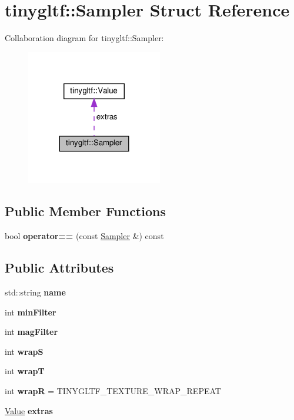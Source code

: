 \hypertarget{structtinygltf_1_1Sampler}{}\section{tinygltf\+:\+:Sampler Struct Reference}
\label{structtinygltf_1_1Sampler}


Collaboration diagram for tinygltf\+:\+:Sampler\+:\nopagebreak
\begin{figure}[H]
\begin{center}
\leavevmode
\includegraphics[width=168pt]{structtinygltf_1_1Sampler__coll__graph}
\end{center}
\end{figure}
\subsection*{Public Member Functions}
\begin{DoxyCompactItemize}
\item 
\mbox{\label{structtinygltf_1_1Sampler_ad94b183fc9b8d862a6063de036fddc02}} 
bool {\bfseries operator==} (const \hyperlink{structtinygltf_1_1Sampler}{Sampler} \&) const
\end{DoxyCompactItemize}
\subsection*{Public Attributes}
\begin{DoxyCompactItemize}
\item 
\mbox{\label{structtinygltf_1_1Sampler_aed306be57c20668b6acd84af81b58dd4}} 
std\+::string {\bfseries name}
\item 
int {\bfseries min\+Filter}
\item 
int {\bfseries mag\+Filter}
\item 
int {\bfseries wrapS}
\item 
int {\bfseries wrapT}
\item 
\mbox{\label{structtinygltf_1_1Sampler_a00d3c16b17aa3c8124817260443f147e}} 
int {\bfseries wrapR} = T\+I\+N\+Y\+G\+L\+T\+F\+\_\+\+T\+E\+X\+T\+U\+R\+E\+\_\+\+W\+R\+A\+P\+\_\+\+R\+E\+P\+E\+AT
\item 
\mbox{\label{structtinygltf_1_1Sampler_a1135a027c6a1824aaf98b5c6bba8c344}} 
\hyperlink{classtinygltf_1_1Value}{Value} {\bfseries extras}
\end{DoxyCompactItemize}


